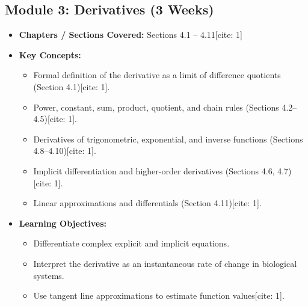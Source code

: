 \documentclass[11pt,a4paper]{article}
\begin{document}
\subsection*{Module 3: Derivatives (3 Weeks) \cite{1}}
\begin{itemize}
    \item \textbf{Chapters / Sections Covered:} Sections 4.1 -- 4.11[cite: 1]
    \item \textbf{Key Concepts:}
    \begin{itemize}
        \item Formal definition of the derivative as a limit of difference quotients (Section 4.1)[cite: 1].
        \item Power, constant, sum, product, quotient, and chain rules (Sections 4.2--4.5)[cite: 1].
        \item Derivatives of trigonometric, exponential, and inverse functions (Sections 4.8--4.10)[cite: 1].
        \item Implicit differentiation and higher-order derivatives (Sections 4.6, 4.7)[cite: 1].
        \item Linear approximations and differentials (Section 4.11)[cite: 1].
    \end{itemize}
    \item \textbf{Learning Objectives:}
    \begin{itemize}
        \item Differentiate complex explicit and implicit equations.
        \item Interpret the derivative as an instantaneous rate of change in biological systems.
        \item Use tangent line approximations to estimate function values[cite: 1].
    \end{itemize}
\end{itemize}
\end{document}
